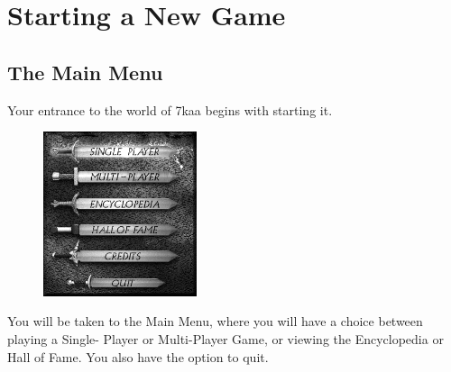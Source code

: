 
\chapter{Starting a New Game}

\section{The Main Menu}

Your entrance to the world of 7kaa begins with starting it.

\begin{figure}
	\begin{center}
		\vspace{-20pt}
		\includegraphics[width=0.4\textwidth]{SWmainmenu}
	\end{center}
	\vspace{-20pt}
\end{figure}

You will be taken to the Main Menu, where you will have a choice between playing a Single- Player or Multi-Player Game, or viewing the Encyclopedia or Hall of Fame. You also have the option to quit.

